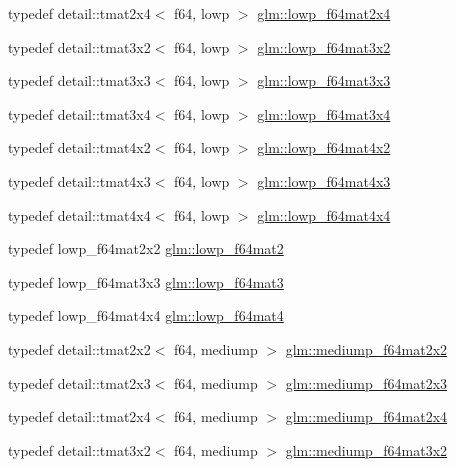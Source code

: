 \begin{CompactItemize}
\item 
typedef detail::tmat2x4$<$ f64, lowp $>$ \hyperlink{group__gtc__type__precision_g38366c50f2a2755c49110c7fc1441683}{glm::lowp\_\-f64mat2x4}
\item 
typedef detail::tmat3x2$<$ f64, lowp $>$ \hyperlink{group__gtc__type__precision_g99f6455a37a4c407a26981561184c76d}{glm::lowp\_\-f64mat3x2}
\item 
typedef detail::tmat3x3$<$ f64, lowp $>$ \hyperlink{group__gtc__type__precision_g3b636bef3048da2f7935eae13e66f7b3}{glm::lowp\_\-f64mat3x3}
\item 
typedef detail::tmat3x4$<$ f64, lowp $>$ \hyperlink{group__gtc__type__precision_g988c6645dead17a842c47ec042b5369e}{glm::lowp\_\-f64mat3x4}
\item 
typedef detail::tmat4x2$<$ f64, lowp $>$ \hyperlink{group__gtc__type__precision_g37d10de43251a9a1be734bbb340ad2e7}{glm::lowp\_\-f64mat4x2}
\item 
typedef detail::tmat4x3$<$ f64, lowp $>$ \hyperlink{group__gtc__type__precision_g05dba0f9d45301c7b10a9276c60b8a0e}{glm::lowp\_\-f64mat4x3}
\item 
typedef detail::tmat4x4$<$ f64, lowp $>$ \hyperlink{group__gtc__type__precision_gb7d0922ed8d93ee3ce995858feb41231}{glm::lowp\_\-f64mat4x4}
\item 
typedef lowp\_\-f64mat2x2 \hyperlink{group__gtc__type__precision_g2984b3b0b6ee0657044d186bb875b4e3}{glm::lowp\_\-f64mat2}
\item 
typedef lowp\_\-f64mat3x3 \hyperlink{group__gtc__type__precision_g4acbda53fb7ff9568c0a2786fad450b8}{glm::lowp\_\-f64mat3}
\item 
typedef lowp\_\-f64mat4x4 \hyperlink{group__gtc__type__precision_g4378d9384f1b24848043ccb02dcf2959}{glm::lowp\_\-f64mat4}
\item 
typedef detail::tmat2x2$<$ f64, mediump $>$ \hyperlink{group__gtc__type__precision_gcfa9f872c78d9e8b8e6c5dd0088db8fc}{glm::mediump\_\-f64mat2x2}
\item 
typedef detail::tmat2x3$<$ f64, mediump $>$ \hyperlink{group__gtc__type__precision_g6f463cb5e9b4e5c07a385843ed50e6b8}{glm::mediump\_\-f64mat2x3}
\item 
typedef detail::tmat2x4$<$ f64, mediump $>$ \hyperlink{group__gtc__type__precision_g65c67789f7e2ff605d8f48dc3750a515}{glm::mediump\_\-f64mat2x4}
\item 
typedef detail::tmat3x2$<$ f64, mediump $>$ \hyperlink{group__gtc__type__precision_gd6408472435fce994a3bb9d14d321ddd}{glm::mediump\_\-f64mat3x2}
\item 

\end{CompactItemize}
